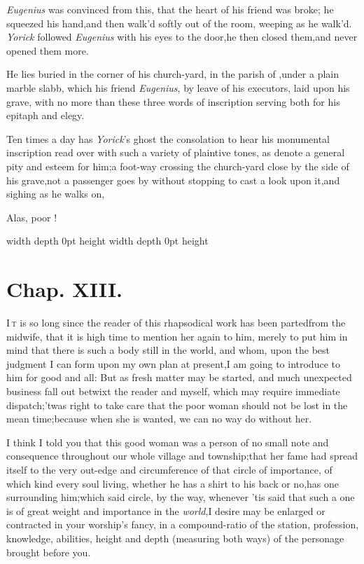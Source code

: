 \documentclass{article}
\begin{document}
\textit{Eugenius} was convinced from this, that the heart of his
friend was broke; he squeezed his hand,\tsh  and then\break
walk’d softly out of the room, weeping as he walk’d. \textit{Yorick}
followed \textit{Eugenius} with his eyes to the door,\tsk  he then\pb
closed them,\tsk and never opened them more.

He lies buried in the corner of his church-yard, in the parish of
\tsh,\break under a plain marble slabb, which his friend
\textit{Eugenius}, by leave of his executors, laid upon his grave, with no more
than these three words of inscription serving both for his epitaph and
elegy.

\vfill
\centerline{}
\vfill

Ten times a day has \textit{Yorick}’s ghost the consolation to hear his
monumental inscription read over with such a variety of plaintive tones, as
denote a general\pb
pity and esteem for him;\tsh  a foot-way crossing the
church-yard close by the side of his grave,\tsk  not a passenger goes by
without stopping to cast a look upon it,\tsh  and sighing as he walks on,

\bigskip
\bigskip
\centerline{Alas, poor !}
\newpage \noindent \vrule width \hsize depth 0pt height \vsize
\newpage \noindent \vrule width \hsize depth 0pt height \vsize
\newpage

\section{Chap. XIII.}

\lettrine{I}{\,t} is so long since the reader of
this rhapsodical work has been parted\break from the midwife, that it is
high time to mention her again to him, merely to put him in mind
that there is such a body still in the world, and whom, upon the
best judgment I can form upon my own plan at present,\tsk I am going to
introduce to him for good and all: But as fresh matter may be
started, and much unexpected business fall out betwixt the reader
and myself, which may require immediate
dispatch;\tsh  ’twas right to take care that the poor
woman should not be lost in the mean time;\tsk  because when she
is wanted, we can no way do without her.

\newpage
I think I told you that this good woman was a person of no small
note and consequence throughout our whole village and
township;\tsk  that her fame had spread itself to the very
out-edge and circumference of that circle of importance, of which
kind every soul living, whether he has a shirt to his back or no,\tsh  has
one surrounding him;\tsk  which said circle, by the way, whenever
’tis said that such a one is of great weight and importance
in the \textit{world},\tsh  I desire may be enlarged or
contracted in your worship’s fancy, in a compound-ratio of
the station, profession, knowledge, abilities, height and depth
(measuring both ways) of the personage brought before you.
\end{document}
